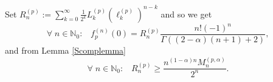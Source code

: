 \documentclass[11pt,a4paper]{article}
\theoremstyle{plain}
\theoremstyle{definition}
\newcommand{\NN}{\mathbb{N}}
\begin{document}
Set $R^{(p)}_n:=\sum_{k= 0}^\infty\frac{1}{2^k}L^{(p)}_k(\ell^{(p)}_{k})^{n-k}$ and so we get
\begin{equation}\label{theorem1siddiqiequ3}
	 \forall\;n\in\NN_0:\;\;\;f^{(n)}_{p}(0)=R^{(p)}_n\frac{n!(-1)^n}{{\Gamma((2-\alpha)(n+1)+2)}},
\end{equation}
and from Lemma \ref{Scomplemma}
\begin{equation}\label{theorem1siddiqiequ4}
	 \forall\;n\in\NN_0:\;\;\;R^{(p)}_n\geq\frac{n^{(1-\alpha)n}M^{(p,\alpha)}_n}{2^n}.
\end{equation}
\end{document}
